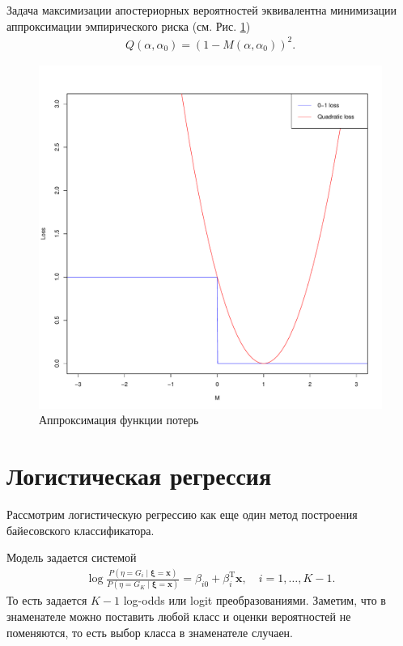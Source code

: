 \documentclass{article}
\begin{document}
Задача максимизации апостериорных вероятностей эквивалентна минимизации аппроксимации эмпирического риска (см. Рис. \ref{fig:quadraticLoss})
\begin{align*}
  Q(\alpha, \alpha_0) = (1 - M(\alpha, \alpha_0))^2.
\end{align*}



\begin{figure}[h]

  \begin{center}
  \includegraphics[width=0.8\linewidth]{quadraticLoss.pdf}
\end{center}
  \caption{Аппроксимация функции потерь}
  \label{fig:quadraticLoss}
\end{figure}

\section{Логистическая регрессия}
Рассмотрим логистическую регрессию как еще один метод построения байесовского классификатора.

Модель задается системой
\begin{align*}
  \log\frac{P(\eta = G_i \mid \boldsymbol{\xi} = \mathbf{x})}{P(\eta = G_K \mid \boldsymbol{\xi} = \mathbf{x})} = \beta_{i0} + \beta_{i}^\mathrm{T}\mathbf{x}, \quad i = 1,\ldots, K - 1.
\end{align*}
То есть задается $K-1$ log-odds или logit преобразованиями. Заметим, что в знаменателе можно поставить любой класс и оценки вероятностей не поменяются, то есть выбор класса в знаменателе случаен.
\end{document}
